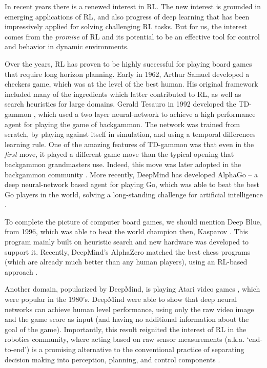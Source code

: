 In recent years there is a renewed interest in RL. The new interest is grounded in  emerging applications
of RL, and also progress of deep learning that
has been impressively applied for solving challenging RL tasks. 
But for us, the interest comes from the {\em promise} of RL and its
potential to be an effective tool for control and behavior in dynamic environments.

Over the years, RL  has proven to be highly
successful for playing board games that require long horizon planning. 
Early in 1962, Arthur Samuel \cite{Samuel62} developed a checkers game, which was at
the level of the best human. His original framework included many of
the ingredients which latter contributed to RL,
as well as search heuristics for large domains.
Gerald
Tesauro in 1992 developed the TD-gammon \cite{Tesauro95}, which used a two layer
neural-network to achieve a high performance agent for playing the game of backgammon. The network was trained from scratch, by playing against itself in simulation, and using a temporal differences learning rule. One of the amazing features
of TD-gammon was that even in the {\em first} move, it played a
different game move than the typical opening that backgammon grandmasters use. Indeed, this move was later adopted in the backgammon community \cite{Tesauro02}.
More recently, DeepMind has developed AlphaGo -- a deep neural-network based agent
for playing Go, which was able to beat the best Go players in the world, solving a long-standing challenge for artificial intelligence \cite{SilverHMGSDSAPL16}. 

To complete the picture of computer board games, we should mention
Deep Blue, from 1996, which was able to beat the world champion then,
Kasparov \cite{DeepBlue}. This program mainly built on heuristic search and new hardware was developed to support it. Recently, DeepMind's
AlphaZero matched the best chess
programs (which are already much better than any human players), using an RL-based approach \cite{silver2017mastering}.

Another domain, popularized by DeepMind, is playing Atari video
games \cite{mnih2015human}, which were popular in the 1980's. DeepMind were able to
show that deep neural networks can achieve human level performance,
using only the raw video image and the game score as input (and having no additional
information about the goal of the game). Importantly, this result reignited the interest of RL in the robotics community, where acting based on raw sensor measurements (a.k.a. `end-to-end') is a promising alternative to the conventional practice of separating decision making into perception, planning, and control components \cite{levine2016end}.

